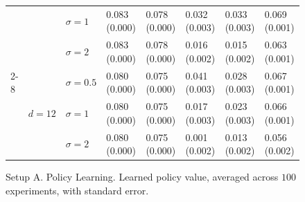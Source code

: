 \documentclass[11pt]{article} %
\theoremstyle{theorem}  %
\theoremstyle{plain}
\begin{document}
\begin{figure}[H]
\begin{tabular}{llllllll}
         &        & $\sigma=1$ &  0.083 (0.000) &  0.078 (0.000) &  0.032 (0.003) &  0.033 (0.003) &  0.069 (0.001) \\
         &        & $\sigma=2$ &  0.083 (0.000) &  0.078 (0.000) &  0.016 (0.002) &  0.015 (0.002) &  0.063 (0.001) \\
\cline{2-8}
         & \multirow{3}{*}{$d=12$} & $\sigma=0.5$ &  0.080 (0.000) &  0.075 (0.000) &  0.041 (0.003) &  0.028 (0.003) &  0.067 (0.001) \\
         &        & $\sigma=1$ &  0.080 (0.000) &  0.075 (0.000) &  0.017 (0.003) &  0.023 (0.003) &  0.066 (0.001) \\
         &        & $\sigma=2$ &  0.080 (0.000) &  0.075 (0.000) &  0.001 (0.002) &  0.013 (0.002) &  0.056 (0.002) \\
\bottomrule
\end{tabular}

\caption{Setup A. Policy Learning. Learned policy value, averaged across $100$ experiments, with standard error.}
\label{fig:setupA-policy}
\end{figure}
 
\end{document}
